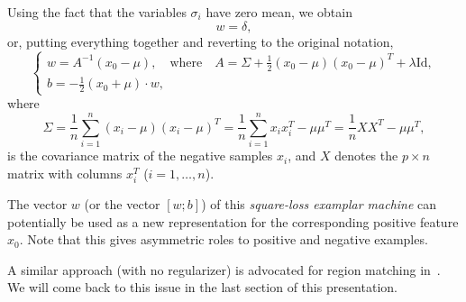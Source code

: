 \documentclass[12pt,letterpaper]{article}
\begin{document}
Using the fact that the variables $\sigma_i$ have zero
mean, we obtain
\begin{equation}
[\frac{1}{n}\sum_{i=1}^n\sigma_i\sigma_i^T +\frac{1}{2}\delta\delta^T +\lambda\text{Id}]
w=\delta,
\end{equation}
or, putting everything together and reverting to the original notation,
\begin{equation}
\left\{\begin{array}{l}
\displaystyle w=A^{-1} (x_0-\mu),\quad\text{where}\quad
A=\Sigma
+\frac{1}{2}(x_0-\mu)(x_0-\mu)^T +\lambda\text{Id},\\
\displaystyle b=-\frac{1}{2}(x_0+\mu)\cdot w,
\end{array}\right.
\label{eq:final}
\end{equation}
where
\begin{equation}
\Sigma=\frac{1}{n}\sum_{i=1}^n(x_i-\mu)(x_i-\mu)^T
=\frac{1}{n}\sum_{i=1}^n x_ix_i^T-\mu\mu^T=\frac{1}{n}XX^T-\mu\mu^T,
\label{eq:Sigmadef}
\end{equation}
is the covariance matrix of the negative samples $x_i$, and
$X$ denotes the $p\times n$ matrix with columns $x_i^T$ ($i=1,\ldots,n$).
 
The vector $w$ (or the vector $[w;b]$) of this {\em square-loss
examplar machine} can potentially be used as a new representation for
the corresponding positive feature $x_0$. Note that this gives
asymmetric roles to positive and negative examples.
 
A similar approach (with no regularizer) is advocated for region
matching in~\cite{ARS14}. We will come back to this issue in the last
section of this presentation.
 
 
 
\end{document}
